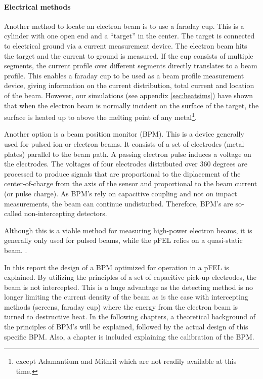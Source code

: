 \paragraph{Electrical methods}
Another method to locate an electron beam is to use a faraday cup. This is a cylinder with one open end and a ``target'' in the center. The target is connected to electrical ground via a current measurement device. 
The electron beam hits the target and the current to ground is measured. If the cup consists of multiple segments, the current profile over different segments directly translates to a beam profile.
This enables a faraday cup to be used as a beam profile measurement device, giving information on the current distribution, total current and location of the beam.
However, our simulations (see appendix \ref{sec:heatsims}) have shown that when the electron beam is normally incident on the surface of the target, the surface is heated up to above the melting point of any metal\footnote{except Adamantium and Mithril which are not readily available at this time.}.

Another option is a beam position monitor (BPM). This is a device generally used for pulsed ion or electron beams. It consists of a set of electrodes (metal plates) parallel to the beam path. A passing electron pulse induces a voltage on the electrodes. The voltages of four electrodes distributed over 360 degrees are processed to produce signals that are proportional to the diplacement of the center-of-charge from the axis of the sensor and proportional to the beam current (or pulse charge).
As BPM's rely on capacitive coupling and not on impact measurements, the beam can continue undisturbed. Therefore, BPM's are so-called non-intercepting detectors.

Although this is a viable method for measuring high-power electron beams, it is generally only used for pulsed beams, while the pFEL relies on a quasi-static beam. .

In this report the design of a BPM optimized for operation in a pFEL is explained.
By utilizing the principles of a set of capacitive pick-up electrodes, the beam is not intercepted. This is a huge advantage as the detecting method is no longer limiting the current density of the beam as is the case with intercepting methods (screens, faraday cup) where the energy from the electron beam is turned to destructive heat. 
In the following chapters, a theoretical background of the principles of BPM's will be explained, followed by the actual design of this specific BPM. Also, a chapter is included explaining the calibration of the BPM.

